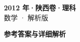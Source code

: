 \documentclass[zihao=-4, a4paper]{ctexart}
\begin{document}
\begin{center}
  {\Large\bfseries 2012 年·陕西卷·理科}\\[4pt]
  {\large 数学 · 解析版}
\end{center}
\medskip
{}

\clearpage
{}
\begin{center}{\Large\bfseries 参考答案与详细解析}\end{center}
\medskip

\end{document}
